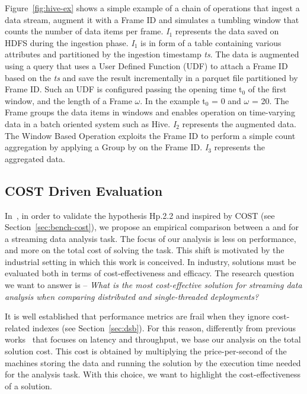 {Figure~\ref{fig:hive-ex} shows a simple example of a chain of operations that ingest a data stream, augment it with a Frame ID and simulates a tumbling window that counts the number of data items per frame. \textit{I$_1$} represents the data saved on HDFS during the ingestion phase. \textit{I$_1$} is in form of a table containing various attributes and partitioned by the ingestion timestamp \textit{ts}. The data is augmented using a query that uses a User Defined Function (UDF) to attach a Frame ID based on the \textit{ts} and save the result incrementally in a parquet file partitioned by Frame ID. Such an UDF is configured passing the opening time t$_0$ of the first window, and the length of a Frame  $\omega$. In the example t$_0$ = 0 and $\omega$ = 20. The Frame groups the data items in windows and enables operation on time-varying data in a batch oriented system such as Hive. \textit{I$_2$} represents the augmented data. The Window Based Operation exploits the Frame ID to perform a simple count aggregation by applying a Group by on the Frame ID.  \textit{I$_3$} represents the aggregated data.

\subsection{COST Driven Evaluation} \label{sec:comp-mod-eval-cost}
In~\cite{DBLP:conf/debs/BalduiniPV18}, in order to validate the hypothesis \textsf{Hp.2.2} and inspired by COST (see Section~\ref{sec:bench-cost}), we propose an empirical comparison between a \sparkdi{} and \sti{} for a streaming data analysis task. The focus of our analysis is less on performance, and more on the total cost of solving the task. This shift is motivated by the industrial setting in which this work is conceived. In industry, solutions must be evaluated both in terms of cost-effectiveness and efficacy. The research question we want to answer is -- \textit{What is the most cost-effective solution for streaming data analysis when comparing distributed and single-threaded deployments?}

It is well established that performance metrics are frail when they ignore cost-related indexes (see Section~\ref{sec:dsb}). For this reason, differently from previous works~\cite{arasu2004linear,chintapalli2016benchmarking} that focuses on latency and throughput, we base our analysis on the total solution cost. This cost is obtained by multiplying the price-per-second of the machines storing the data and running the solution by the execution time needed for the analysis task. With this choice, we want to highlight the cost-effectiveness of a solution.

}
